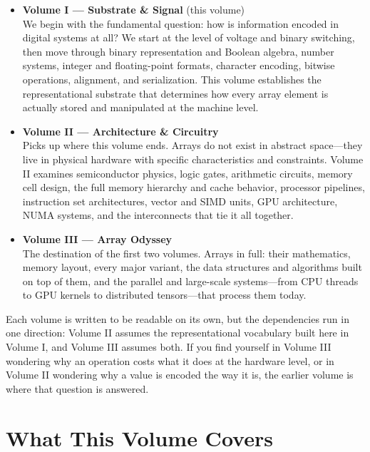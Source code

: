 \begin{itemize}
	\item \textbf{Volume I --- Substrate \& Signal} (this volume)\\
	We begin with the fundamental question: how is information encoded in digital systems at all? We start at the level of voltage and binary switching, then move through binary representation and Boolean algebra, number systems, integer and floating-point formats, character encoding, bitwise operations, alignment, and serialization. This volume establishes the representational substrate that determines how every array element is actually stored and manipulated at the machine level.

	\item \textbf{Volume II --- Architecture \& Circuitry}\\
	Picks up where this volume ends. Arrays do not exist in abstract space---they live in physical hardware with specific characteristics and constraints. Volume II examines semiconductor physics, logic gates, arithmetic circuits, memory cell design, the full memory hierarchy and cache behavior, processor pipelines, instruction set architectures, vector and SIMD units, GPU architecture, NUMA systems, and the interconnects that tie it all together.

	\item \textbf{Volume III --- Array Odyssey}\\
	The destination of the first two volumes. Arrays in full: their mathematics, memory layout, every major variant, the data structures and algorithms built on top of them, and the parallel and large-scale systems---from CPU threads to GPU kernels to distributed tensors---that process them today.
\end{itemize}

Each volume is written to be readable on its own, but the dependencies run in one direction: Volume II assumes the representational vocabulary built here in Volume I, and Volume III assumes both. If you find yourself in Volume III wondering why an operation costs what it does at the hardware level, or in Volume II wondering why a value is encoded the way it is, the earlier volume is where that question is answered.

\section*{What This Volume Covers}

